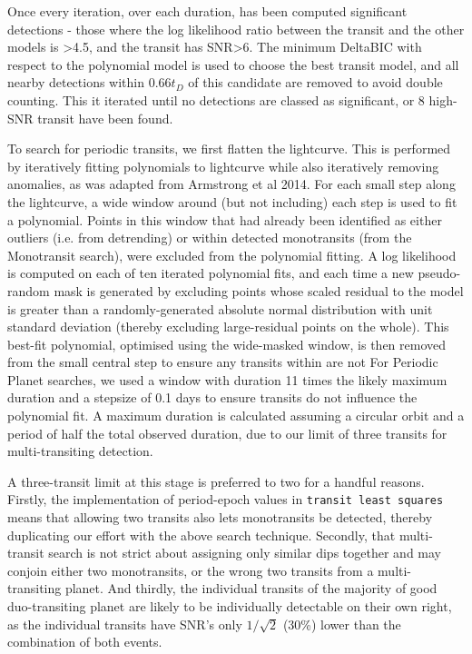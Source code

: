 \documentclass{article}
\begin{document}
Once every iteration, over each duration, has been computed significant detections - those where the log likelihood ratio between the transit and the other models is >4.5, and the transit has SNR>6.
The minimum DeltaBIC with respect to the polynomial model is used to choose the best transit model, and all nearby detections within $0.66t_D$ of this candidate are removed to avoid double counting.
This it iterated until no detections are classed as significant, or 8 high-SNR transit have been found.

To search for periodic transits, we first flatten the lightcurve. 
This is performed by iteratively fitting polynomials to lightcurve while also iteratively removing anomalies, as was adapted from Armstrong et al 2014.
For each small step along the lightcurve, a wide window around (but not including) each step is used to fit a polynomial.
Points in this window that had already been identified as either outliers (i.e. from detrending) or within detected monotransits (from the Monotransit search), were excluded from the polynomial fitting.
A log likelihood is computed on each of ten iterated polynomial fits, and each time a new pseudo-random mask is generated by excluding points whose scaled residual to the model is greater than a randomly-generated absolute normal distribution with unit standard deviation (thereby excluding large-residual points on the whole).
This best-fit polynomial, optimised using the wide-masked window, is then removed from the small central step to ensure any transits within are not 
For Periodic Planet searches, we used a window with duration 11 times the likely maximum duration and a stepsize of 0.1 days to ensure transits do not influence the polynomial fit.
A maximum duration is calculated assuming a circular orbit and a period of half the total observed duration, due to our limit of three transits for multi-transiting detection.

A three-transit limit at this stage is preferred to two for a handful reasons. Firstly, the implementation of period-epoch values in \texttt{transit least squares} means that allowing two transits also lets monotransits be detected, thereby duplicating our effort with the above search technique. 
Secondly, that multi-transit search is not strict about assigning only similar dips together and may conjoin either two monotransits, or the wrong two transits from a multi-transiting planet.
And thirdly, the individual transits of the majority of good duo-transiting planet are likely to be individually detectable on their own right, as the individual transits have SNR's only $1/\sqrt{2}$ (30\%) lower than the combination of both events.
\end{document}
